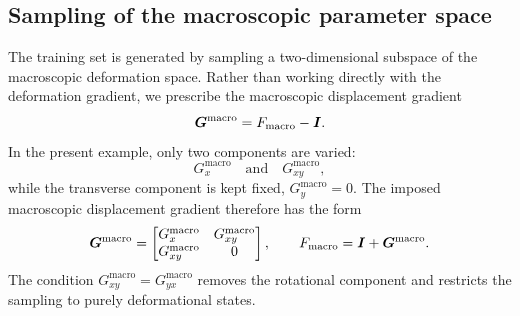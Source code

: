 \documentclass[11pt,a4paper]{article}
\newcommand{\PROMPT}[1]{ }
\begin{document}
\PROMPT{Now let us describe how to explore the parameteric space. We choose a structured grid of sampling points of $F_x^{macro}$ and $F_{xy}^{macro}$, that is, we have to specify the ``corners'' of the parametric space (please, put this more elegantly).  So, from the training point of view, we have to determine finite element states by solving the equilibrium of the unit cell for varying values of these two parameters (with $F_y = 1$). Actually, now that I think, it is better to use the gradient of displacements.  Let us elaborate this a little bit further by inspecting how it is done in the code (everything related to the code should be put into a \\MATLAB{} note, because I will hide it when writing the paper. Be that as it may, in the case that we are going to show later, the running script is /home/joaquin/Desktop/CURRENT_TASKS/MATLAB_CODES/TESTING_PROBLEMS_FEHROM/115_PAPER_MAW_ECM/01_METATcellHOM_2var/Run_HOMOG_2p.m.   The input data file is /home/joaquin/Desktop/CURRENT_TASKS/MATLAB_CODES/TESTING_PROBLEMS_FEHROM/115_PAPER_MAW_ECM/01_METATcellHOM_2var/DATAINPUTS/Data_M3.m, and then, inside:  /home/joaquin/Desktop/CURRENT_TASKS/MATLAB_CODES/TESTING_PROBLEMS_FEHROM/115_PAPER_MAW_ECM/01_METATcellHOM_2var/BC2v_M.m    ....There, there are two parameters DATAOUT.INPp.ParameterDomain_F_11 = [-0.42,0.42], DATAOUT.INPp.ParameterDomain_F_12 = [-0.05,0.05];DATAOUT.INPp.nsteps_F11 = 230;
DATAOUT.INPp.nsteps_F_12 = 20 ;  and /home/joaquin/Desktop/CURRENT_TASKS/MATLAB_CODES/TESTING_PROBLEMS_FEHROM/115_PAPER_MAW_ECM/01_METATcellHOM_2var/DetermineTrajectories_cg.m   and /home/joaquin/Desktop/CURRENT_TASKS/MATLAB_CODES/TESTING_PROBLEMS_FEHROM/115_PAPER_MAW_ECM/01_METATcellHOM_2var/buildGridTrajAndLabels.m. REad this and wait for my instructions

 )}

\subsection{Sampling of the macroscopic parameter space}

The training set is generated by sampling a two-dimensional subspace of the
macroscopic deformation space. Rather than working directly with the deformation
gradient, we prescribe the macroscopic displacement gradient
\[
\bm{G}^{\mathrm{macro}} = F_{\mathrm{macro}} - \bm{I}.
\]
In the present example, only two components are varied:
\[
G^{\mathrm{macro}}_x
\quad \text{and} \quad
G^{\mathrm{macro}}_{xy},
\]
while the transverse component is kept fixed, \(G^{\mathrm{macro}}_y=0\). The
imposed macroscopic displacement gradient therefore has the form
\[
\bm{G}^{\mathrm{macro}}
=
\begin{bmatrix}
G^{\mathrm{macro}}_x & G^{\mathrm{macro}}_{xy} \\
G^{\mathrm{macro}}_{xy} & 0
\end{bmatrix},
\qquad
F_{\mathrm{macro}} = \bm{I}+\bm{G}^{\mathrm{macro}} .
\]
The condition \(G^{\mathrm{macro}}_{xy}=G^{\mathrm{macro}}_{yx}\) removes the
rotational component and restricts the sampling to purely deformational states.
\end{document}
